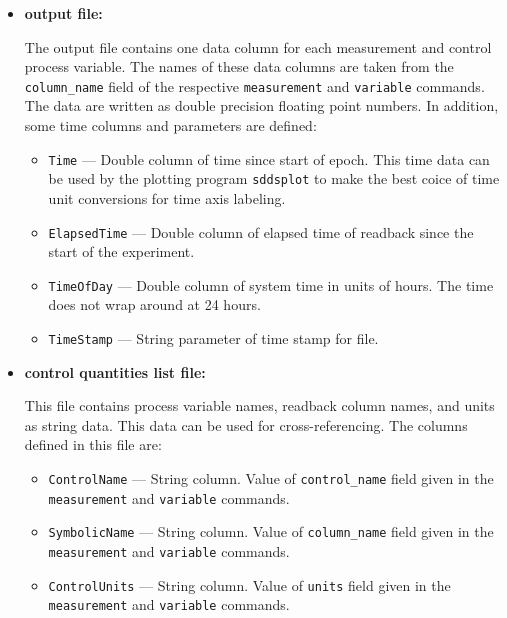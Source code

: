 \begin{itemize}
\newpage
\item {\bf output file:}\par
The output file contains one data column for each measurement and control process variable.
The names of these data columns are taken from the \verb+column_name+ field of the
respective \verb+measurement+ and \verb+variable+ commands. The data are written
as double precision floating point numbers. 
In addition, some time columns and parameters are defined:
\begin{itemize}
        \item {\tt Time} --- Double column of time since start of epoch. This time data can be used by
        the plotting program {\verb+sddsplot+} to make the best coice of time unit conversions
        for time axis labeling.
        \item {\tt ElapsedTime} --- Double column of elapsed time of readback since the start of the experiment.
        \item {\tt TimeOfDay} --- Double column of system time in units of hours. 
                The time does not wrap around at 24 hours.
        \item {\tt TimeStamp} --- String parameter of time stamp for file.
\end{itemize}

\item {\bf control quantities list file:}\par
        This file contains process variable names, readback column names, and units as string data. 
        This data can be used for cross-referencing. The columns defined in this file are:
\begin{itemize}
        \item {\tt ControlName} --- String column. Value of \verb+control_name+ field given in the 
                \verb+measurement+ and \verb+variable+ commands.
        \item {\tt SymbolicName} --- String column. Value of \verb+column_name+ field given in the 
                \verb+measurement+ and \verb+variable+ commands.
        \item {\tt ControlUnits} --- String column.  Value of \verb+units+ field given in the 
                \verb+measurement+ and \verb+variable+ commands.
\end{itemize}
\end{itemize}


